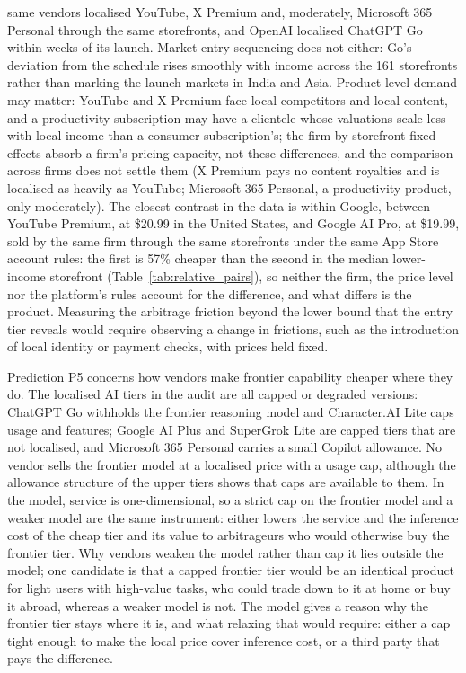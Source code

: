 \documentclass[11pt]{article}
\theoremstyle{definition}
\theoremstyle{remark}
\begin{document}
same vendors localised YouTube, X Premium and, moderately, Microsoft 365 Personal through the same storefronts, and OpenAI localised ChatGPT Go within weeks of its launch. Market-entry sequencing does not either: Go's deviation from the schedule rises smoothly with income across the 161 storefronts rather than marking the launch markets in India and Asia. Product-level demand may matter: YouTube and X Premium face local competitors and local content, and a productivity subscription may have a clientele whose valuations scale less with local income than a consumer subscription's; the firm-by-storefront fixed effects absorb a firm's pricing capacity, not these differences, and the comparison across firms does not settle them (X Premium pays no content royalties and is localised as heavily as YouTube; Microsoft 365 Personal, a productivity product, only moderately). The closest contrast in the data is within Google, between YouTube Premium, at \$20.99 in the United States, and Google AI Pro, at \$19.99, sold by the same firm through the same storefronts under the same App Store account rules: the first is 57\% cheaper than the second in the median lower-income storefront (Table~\ref{tab:relative_pairs}), so neither the firm, the price level nor the platform's rules account for the difference, and what differs is the product. Measuring the arbitrage friction beyond the lower bound that the entry tier reveals would require observing a change in frictions, such as the introduction of local identity or payment checks, with prices held fixed.

Prediction P5 concerns how vendors make frontier capability cheaper where they do. The localised AI tiers in the audit are all capped or degraded versions: ChatGPT Go withholds the frontier reasoning model and Character.AI Lite caps usage and features; Google AI Plus and SuperGrok Lite are capped tiers that are not localised, and Microsoft 365 Personal carries a small Copilot allowance. No vendor sells the frontier model at a localised price with a usage cap, although the allowance structure of the upper tiers shows that caps are available to them. In the model, service is one-dimensional, so a strict cap on the frontier model and a weaker model are the same instrument: either lowers the service and the inference cost of the cheap tier and its value to arbitrageurs who would otherwise buy the frontier tier. Why vendors weaken the model rather than cap it lies outside the model; one candidate is that a capped frontier tier would be an identical product for light users with high-value tasks, who could trade down to it at home or buy it abroad, whereas a weaker model is not. The model gives a reason why the frontier tier stays where it is, and what relaxing that would require: either a cap tight enough to make the local price cover inference cost, or a third party that pays the difference.
\end{document}
